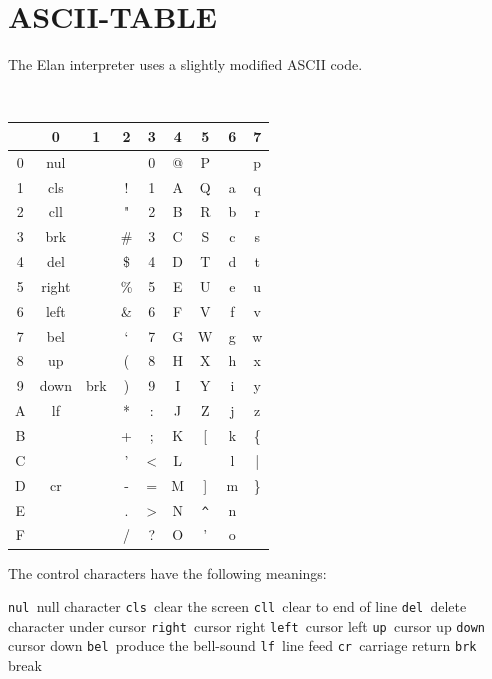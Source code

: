 \chapter{ASCII-TABLE}

The Elan interpreter uses a slightly modified ASCII code.

\vspace{1.5em}

{\tt
\begin{tabular}{|c|c|c|c|c|c|c|c|c|}
\hline
   &   0   &  1  &  2  &  3  &  4  &  5  &  6  &  7  \\
\hline
 0 & nul   &     &  \  &  0  &  @  &  P  &     &  p  \\
 1 & cls   &     &  !  &  1  &  A  &  Q  &  a  &  q  \\
 2 & cll   &     &  "  &  2  &  B  &  R  &  b  &  r  \\
 3 & brk   &     &  \# &  3  &  C  &  S  &  c  &  s  \\
\hline
 4 & del   &     &  \$ &  4  &  D  &  T  &  d  &  t  \\
 5 & right &     &  \% &  5  &  E  &  U  &  e  &  u  \\
 6 & left  &     &  \& &  6  &  F  &  V  &  f  &  v  \\
 7 & bel   &     &  `  &  7  &  G  &  W  &  g  &  w  \\
\hline
 8 & up    &     &  (  &  8  &  H  &  X  &  h  &  x  \\
 9 & down  & brk &  )  &  9  &  I  &  Y  &  i  &  y  \\
 A & lf    &     &  *  &  :  &  J  &  Z  &  j  &  z  \\
 B &       &     &  +  &  ;  &  K  &  [  &  k  &  \{ \\
\hline
 C &       &     &  '  &  <  &  L  &     &  l  &  |  \\
 D & cr    &     &  -  &  =  &  M  &  ]  &  m  &  \} \\
 E &       &     &  .  &  >  &  N  &  \verb+^+  &  n  &     \\
 F &       &     &  /  &  ?  &  O  &  '  &  o  &     \\
\hline
\end{tabular}
}

\vspace{1.5em}

\noindent
The control characters have the following meanings:

\begin{literal}
{\tt nul             }null character
{\tt cls             }clear the screen
{\tt cll             }clear to end of line
{\tt del             }delete character under cursor
{\tt right           }cursor right
{\tt left            }cursor left
{\tt up              }cursor up
{\tt down            }cursor down
{\tt bel             }produce the bell-sound
{\tt lf              }line feed
{\tt cr              }carriage return
{\tt brk             }break
\end{literal}

